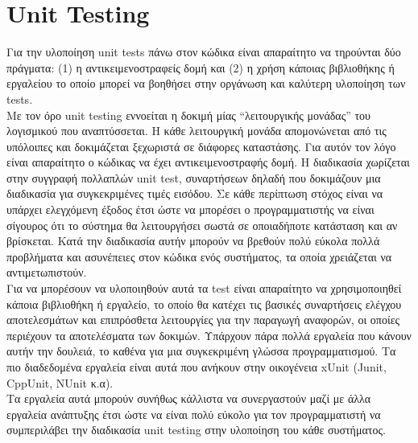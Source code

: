\documentclass[12pt]{article}
\begin{document}
\section {Unit Testing}
Για την υλοποίηση unit tests πάνω στον κώδικα είναι απαραίτητο να τηρούνται δύο πράγματα: (1) η αντικειμενοστραφείς δομή και (2) η χρήση κάποιας βιβλιοθήκης ή εργαλείου το οποίο μπορεί να βοηθήσει στην οργάνωση και καλύτερη υλοποίηση των tests.
\\[0.3cm]
Με τον όρο unit testing εννοείται η δοκιμή μίας “λειτουργικής μονάδας” του λογισμικού που αναπτύσσεται. Η κάθε λειτουργική μονάδα απομονώνεται από τις υπόλοιπες και δοκιμάζεται ξεχωριστά σε διάφορες καταστάσης. Για αυτόν τον λόγο είναι απαραίτητο ο κώδικας να έχει αντικειμενοστραφής δομή. Η διαδικασία χωρίζεται στην συγγραφή πολλαπλών unit test, συναρτήσεων δηλαδή που δοκιμάζουν μια διαδικασία για συγκεκριμένες τιμές εισόδου. Σε κάθε περίπτωση στόχος είναι να υπάρχει ελεγχόμενη έξοδος έτσι ώστε να μπορέσει ο προγραμματιστής να είναι σίγουρος ότι το σύστημα θα λειτουργήσει σωστά σε οποιαδήποτε κατάσταση και αν βρίσκεται. Κατά την διαδικασία αυτήν μπορούν να βρεθούν πολύ εύκολα πολλά προβλήματα και ασυνέπειες στον κώδικα ενός συστήματος, τα οποία χρειάζεται να αντιμετωπιστούν. 
\\[0.3cm]
Για να μπορέσουν να υλοποιηθούν αυτά τα test είναι απαραίτητο να χρησιμοποιηθεί κάποια βιβλιοθήκη ή εργαλείο, το οποίο θα κατέχει τις βασικές συναρτήσεις ελέγχου αποτελεσμάτων και επιπρόσθετα λειτουργίες για την παραγωγή αναφορών, οι οποίες περιέχουν τα αποτελέσματα των δοκιμών. Υπάρχουν πάρα πολλά εργαλεία που κάνουν αυτήν την δουλειά, το καθένα για μια συγκεκριμένη γλώσσα προγραμματισμού. Τα πιο διαδεδομένα εργαλεία είναι αυτά που ανήκουν στην οικογένεια xUnit (Junit, CppUnit, NUnit κ.α).
\\[0.3cm]
Τα εργαλεία αυτά μπορούν συνήθως κάλλιστα να συνεργαστούν μαζί με άλλα εργαλεία ανάπτυξης έτσι ώστε να είναι πολύ εύκολο για τον προγραμματιστή να συμπεριλάβει την διαδικασία unit testing στην υλοποίηση του κάθε συστήματος.
\end{document}
